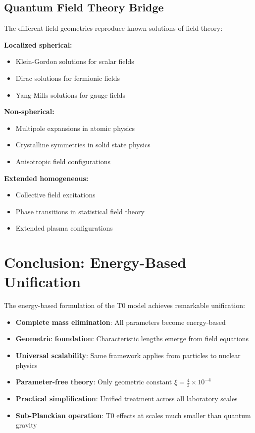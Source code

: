 \documentclass[12pt,a4paper]{report}
\begin{document}
	\subsection{Quantum Field Theory Bridge}
	\label{subsec:qft_bridge}
	
	The different field geometries reproduce known solutions of field theory:
	
	\textbf{Localized spherical:} 
	\begin{itemize}
		\item Klein-Gordon solutions for scalar fields
		\item Dirac solutions for fermionic fields
		\item Yang-Mills solutions for gauge fields
	\end{itemize}
	
	\textbf{Non-spherical:}
	\begin{itemize}
		\item Multipole expansions in atomic physics
		\item Crystalline symmetries in solid state physics
		\item Anisotropic field configurations
	\end{itemize}
	
	\textbf{Extended homogeneous:}
	\begin{itemize}
		\item Collective field excitations
		\item Phase transitions in statistical field theory
		\item Extended plasma configurations
	\end{itemize}
	
	\section{Conclusion: Energy-Based Unification}
	\label{sec:conclusion_energy_unification}
	
	The energy-based formulation of the T0 model achieves remarkable unification:
	
	\begin{itemize}
		\item \textbf{Complete mass elimination}: All parameters become energy-based
		\item \textbf{Geometric foundation}: Characteristic lengths emerge from field equations
		\item \textbf{Universal scalability}: Same framework applies from particles to nuclear physics
		\item \textbf{Parameter-free theory}: Only geometric constant $\xi = \frac{4}{3} \times 10^{-4}$
		\item \textbf{Practical simplification}: Unified treatment across all laboratory scales
		\item \textbf{Sub-Planckian operation}: T0 effects at scales much smaller than quantum gravity
	\end{itemize}
	
\end{document}
